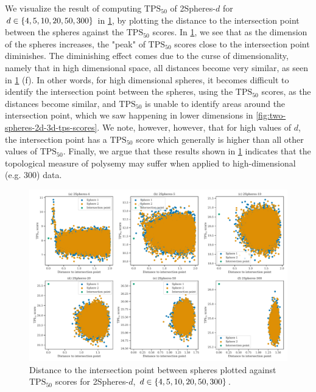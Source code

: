 We visualize the result of computing $\text{TPS}_{50}$ of 2Spheres-$d$ for $d \in \left\{4, 5, 10, 20, 50, 300\right\}$ in \cref{fig:two-spheres-distance-to-int-point-vs-tps-scores}, by plotting the distance to the intersection point between the spheres against the $\text{TPS}_{50}$ scores. In \cref{fig:two-spheres-distance-to-int-point-vs-tps-scores}, we see that as the dimension of the spheres increases, the "peak" of $\text{TPS}_{50}$ scores close to the intersection point diminishes. The diminishing effect comes due to the curse of dimensionality, namely that in high dimensional space, all distances become very similar, as seen in \cref{fig:two-spheres-distance-to-int-point-vs-tps-scores} (f). In other words, for high dimensional spheres, it becomes difficult to identify the intersection point between the spheres, using the $\text{TPS}_{50}$ scores, as the distances become similar, and $\text{TPS}_{50}$ is unable to identify areas around the intersection point, which we saw happening in lower dimensions in \cref{fig:two-spheres-2d-3d-tps-scores}. We note, however, however, that for high values of $d$, the intersection point has a $\text{TPS}_{50}$ score which generally is higher than all other values of $\text{TPS}_{50}$. Finally, we argue that these results shown in \cref{fig:two-spheres-distance-to-int-point-vs-tps-scores} indicates that the topological measure of polysemy may suffer when applied to high-dimensional (e.g. 300) data.
\begin{figure}[H]
    \centering
    \includegraphics[width=\textwidth]{thesis/figures/two-spheres-distance-to-int-point-vs-tps-scores.pdf}
    \caption{Distance to the intersection point between spheres plotted against $\text{TPS}_{50}$ scores for 2Spheres-$d$, $d \in \left\{4, 5, 10, 20, 50, 300\right\}$.}
    \label{fig:two-spheres-distance-to-int-point-vs-tps-scores}
\end{figure}

